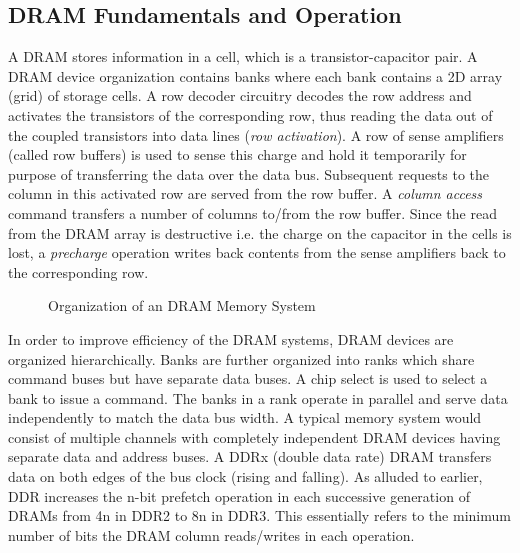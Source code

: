 \subsection{DRAM Fundamentals and Operation}
A DRAM stores information in a cell, which is a transistor-capacitor pair. A DRAM device organization contains banks where each bank contains a 2D array (grid) of storage cells. A row decoder circuitry decodes the row address and activates the transistors of the corresponding row, thus reading the data out of the coupled transistors into data lines (\textit{row activation}). A row of sense amplifiers (called row buffers) is used to sense this charge and hold it temporarily for purpose of transferring the data over the data bus. Subsequent requests to the column in this activated row are served from the row buffer. A \textit{column access} command transfers a number of columns to/from the row buffer. Since the read from the DRAM array is destructive i.e. the charge on the capacitor in the cells is lost, a \textit{precharge} operation writes back contents from the sense amplifiers back to the corresponding row.
\begin{figure}[!htb]
	\centering
	\def\svgwidth{\columnwidth}
	
	\caption{Organization of an DRAM Memory System}
	\label{fig:dram-basics}
\end{figure}
\par In order to improve efficiency of the DRAM systems, DRAM devices are organized hierarchically. Banks are further organized into ranks which share command buses but have separate data buses. A chip select is used to select a bank to issue a command.  The banks in a rank operate in parallel and serve data independently to match the data bus width. A typical memory system would consist of multiple channels with completely independent DRAM devices having separate data and address buses. A DDRx (double data rate) DRAM transfers data on both edges of the bus clock (rising and falling). As alluded to earlier, DDR increases the n-bit prefetch operation in each successive generation of DRAMs from 4n in DDR2 to 8n in DDR3. This essentially refers to the minimum number of bits the DRAM column reads/writes in each operation.
